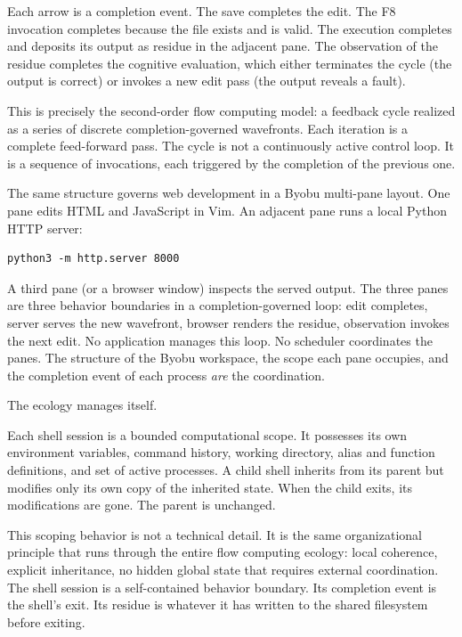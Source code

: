 \documentclass[12pt, a4paper]{article}
\begin{document}
Each arrow is a completion event. The save completes the edit.
The F8 invocation completes because the file exists and is
valid. The execution completes and deposits its output as
residue in the adjacent pane. The observation of the residue
completes the cognitive evaluation, which either terminates
the cycle (the output is correct) or invokes a new edit
pass (the output reveals a fault).

This is precisely the second-order flow computing model:
a feedback cycle realized as a series of discrete
completion-governed wavefronts. Each iteration is a complete
feed-forward pass. The cycle is not a continuously active
control loop. It is a sequence of invocations, each triggered
by the completion of the previous one.

The same structure governs web development in a Byobu
multi-pane layout. One pane edits HTML and JavaScript in Vim.
An adjacent pane runs a local Python HTTP server:

\begin{lstlisting}
python3 -m http.server 8000
\end{lstlisting}

A third pane (or a browser window) inspects the served output.
The three panes are three behavior boundaries in a
completion-governed loop: edit completes, server serves the
new wavefront, browser renders the residue, observation
invokes the next edit. No application manages this loop.
No scheduler coordinates the panes. The structure of the
Byobu workspace, the scope each pane occupies, and the
completion event of each process \emph{are} the coordination.

The ecology manages itself.

Each shell session is a bounded computational scope. It
possesses its own environment variables, command history,
working directory, alias and function definitions, and set
of active processes. A child shell inherits from its parent
but modifies only its own copy of the inherited state. When
the child exits, its modifications are gone. The parent is
unchanged.

This scoping behavior is not a technical detail. It is the
same organizational principle that runs through the entire
flow computing ecology: local coherence, explicit inheritance,
no hidden global state that requires external coordination.
The shell session is a self-contained behavior boundary. Its
completion event is the shell's exit. Its residue is whatever
it has written to the shared filesystem before exiting.
\end{document}
